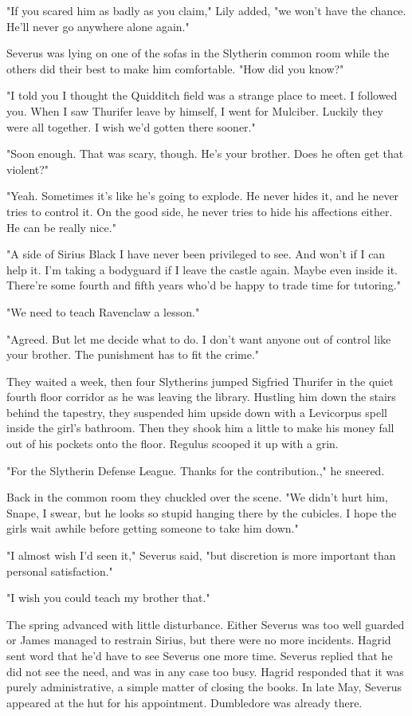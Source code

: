 \documentclass[a4paper,11pt]{article}
\begin{document}
"If you scared him as badly as you claim," Lily added, "we won't have the chance. He'll never go anywhere alone again."

Severus was lying on one of the sofas in the Slytherin common room while the others did their best to make him comfortable. "How did you know?"

"I told you I thought the Quidditch field was a strange place to meet. I followed you. When I saw Thurifer leave by himself, I went for Mulciber. Luckily they were all together. I wish we'd gotten there sooner."

"Soon enough. That was scary, though. He's your brother. Does he often get that violent?"

"Yeah. Sometimes it's like he's going to explode. He never hides it, and he never tries to control it. On the good side, he never tries to hide his affections either. He can be really nice."

"A side of Sirius Black I have never been privileged to see. And won't if I can help it. I'm taking a bodyguard if I leave the castle again. Maybe even inside it. There're some fourth and fifth years who'd be happy to trade time for tutoring."

"We need to teach Ravenclaw a lesson."

"Agreed. But let me decide what to do. I don't want anyone out of control like your brother. The punishment has to fit the crime."

They waited a week, then four Slytherins jumped Sigfried Thurifer in the quiet fourth floor corridor as he was leaving the library. Hustling him down the stairs behind the tapestry, they suspended him upside down with a Levicorpus spell inside the girl's bathroom. Then they shook him a little to make his money fall out of his pockets onto the floor. Regulus scooped it up with a grin.

"For the Slytherin Defense League. Thanks for the contribution.," he sneered.

Back in the common room they chuckled over the scene. "We didn't hurt him, Snape, I swear, but he looks so stupid hanging there by the cubicles. I hope the girls wait awhile before getting someone to take him down."

"I almost wish I'd seen it," Severus said, "but discretion is more important than personal satisfaction."

"I wish you could teach my brother that."

The spring advanced with little disturbance. Either Severus was too well guarded or James managed to restrain Sirius, but there were no more incidents. Hagrid sent word that he'd have to see Severus one more time. Severus replied that he did not see the need, and was in any case too busy. Hagrid responded that it was purely administrative, a simple matter of closing the books. In late May, Severus appeared at the hut for his appointment. Dumbledore was already there.
\end{document}
